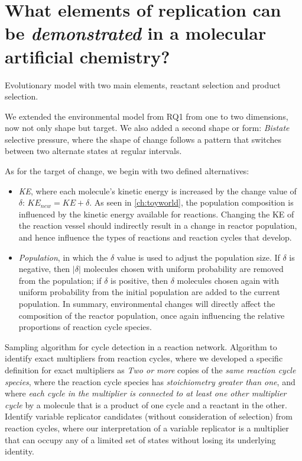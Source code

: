\section{What elements of replication can be \emph{demonstrated} in a molecular artificial chemistry?}

Evolutionary model with two main elements, reactant selection and product selection.

We extended the environmental model from RQ1 from one to two dimensions, now not only shape but target. We also added a second shape or form: \emph{Bistate} selective pressure, where the shape of change follows a pattern that switches between two alternate states at regular intervals. 

As for the target of change, we begin with two defined alternatives:

\begin{itemize}
	\item \emph{KE}, where each molecule's kinetic energy is increased by the change value of $\delta$: $KE_{new} = KE+\delta$. As seen in \cref{ch:toyworld}, the population composition is influenced by the kinetic energy available for reactions. Changing the KE of the reaction vessel should indirectly result in a change in reactor population, and hence influence the types of reactions and reaction cycles that develop.
	\item \emph{Population}, in which the $\delta$ value is used to adjust the population size. If $\delta$ is negative, then $|\delta|$ molecules chosen with uniform probability are removed from the population; if $\delta$ is positive, then $\delta$ molecules chosen again with uniform probability from the initial population are added to the current population. In summary, environmental changes will directly affect the composition of the reactor population, once again influencing the relative proportions of reaction cycle species.
\end{itemize}

Sampling algorithm for cycle detection in a reaction network.
Algorithm to identify exact multipliers from reaction cycles, where we developed a specific definition for exact multipliers as \textit{Two or more} copies of the \textit{same reaction cycle species}, where the reaction cycle species has \textit{stoichiometry greater than one}, and where \textit{each cycle in the multiplier is connected to at least one other multiplier cycle} by a molecule that is a product of one cycle and a reactant in the other.
Identify variable replicator candidates (without consideration of selection) from reaction cycles, where our interpretation of a variable replicator is a multiplier that can occupy any of a limited set of states without losing its underlying identity.

